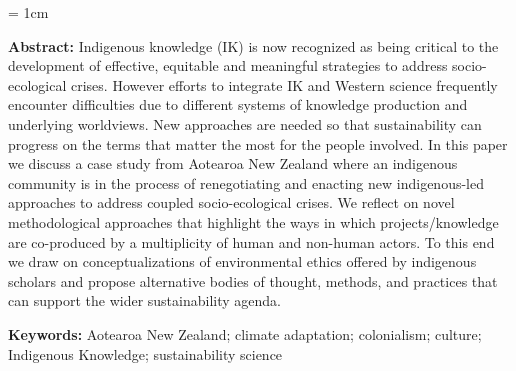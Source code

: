 \documentclass[10pt,a4paper]{article}
\begin{document}
\vspace*{12pt}

\begingroup\leftskip= 1cm\rightskip 1cm  

\textbf{{\color{LibrelloColor}Abstract:}} Indigenous knowledge (IK) is now recognized as being critical to the development of effective, equitable and meaningful strategies to address socio-ecological crises. However efforts to integrate IK and Western science frequently encounter difficulties due to different systems of knowledge production and underlying worldviews. New approaches are needed so that sustainability can progress on the terms that matter the most for the people involved. In this paper we discuss a case study from Aotearoa New Zealand where an indigenous community is in the process of renegotiating and enacting new indigenous-led approaches to address coupled socio-ecological crises. We reflect on novel methodological approaches that highlight the ways in which projects/knowledge are co-produced by a multiplicity of human and non-human actors. To this end we draw on conceptualizations of environmental ethics offered by indigenous scholars and propose alternative bodies of thought, methods, and practices that can support the wider sustainability agenda.

\textbf{{\color{LibrelloColor}Keywords:}} Aotearoa New Zealand; climate adaptation; colonialism; culture; Indigenous Knowledge; sustainability science
\par\endgroup
 
\setlength{\parindent}{0.5cm}
\setlength{\parskip}{0cm}
\setlength{\bibsep}{0cm}

\vspace*{10mm}
\end{document}
